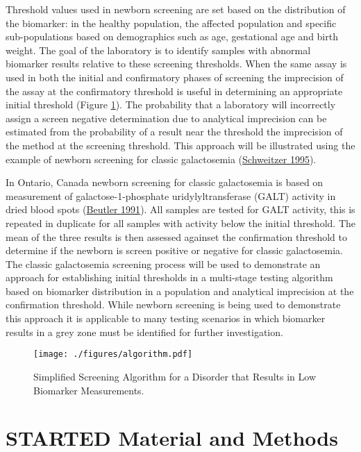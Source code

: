 \documentclass[review]{elsarticle}
\begin{document}
Threshold values used in newborn screening are set based on the
distribution of the biomarker: in the healthy population, the affected
population and specific sub-populations based on demographics such as
age, gestational age and birth weight. The goal of the laboratory is
to identify samples with abnormal biomarker results relative to these
screening thresholds. When the same assay is used in both the initial
and confirmatory phases of screening the imprecision of the assay at
the confirmatory threshold is useful in determining an appropriate
initial threshold (Figure \ref{fig:org07cdf97}). The probability that a
laboratory will incorrectly assign a screen negative determination due
to analytical imprecision can be estimated from the probability of a
result near the threshold the imprecision of the method at the
screening threshold. This approach will be illustrated using the
example of newborn screening for classic galactosemia (\hyperlink{citeproc_bib_item_9}{Schweitzer 1995}).

In Ontario, Canada newborn screening for classic galactosemia is based
on measurement of galactose-1-phosphate uridylyltransferase (GALT)
activity in dried blood spots (\hyperlink{citeproc_bib_item_1}{Beutler 1991}). All samples are
tested for GALT activity, this is repeated in duplicate for all
samples with activity below the initial threshold. The mean of the
three results is then assessed againset the confirmation threshold to
determine if the newborn is screen positive or negative for classic
galactosemia. The classic galactosemia screening process will be used
to demonstrate an approach for establishing initial thresholds in a
multi-stage testing algorithm based on biomarker distribution in a
population and analytical imprecision at the confirmation
threshold. While newborn screening is being used to demonstrate this
approach it is applicable to many testing scenarios in which biomarker
results in a grey zone must be identified for further investigation.


\begin{figure}[htbp]
\centering
\texttt{[image: ./figures/algorithm.pdf]}
\caption{\label{fig:org07cdf97}Simplified Screening Algorithm for a Disorder that Results in Low Biomarker Measurements.}
\end{figure}

\clearpage

\section*{{\bfseries\sffamily STARTED} Material and Methods}
\label{sec:org2cd0086}
\end{document}
